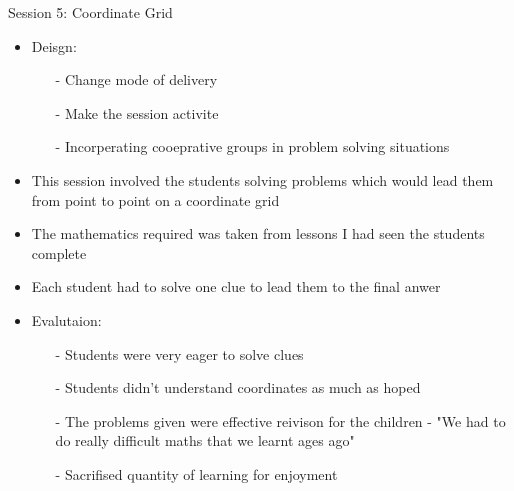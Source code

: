 \documentclass{beamer}  %
\begin{document}
\begin{frame}{Session 5: Coordinate Grid}
    \begin{itemize}
        \item Deisgn:
        \begin{itemize}
            \item[-] Change mode of delivery
            \item[-] Make the session activite
            \item[-] Incorperating cooeprative groups in problem solving situations 
        \end{itemize}
        \item This session involved the students solving problems which would lead them from point to point on a coordinate grid
        \item The mathematics required was taken from lessons I had seen the students complete
        \item Each student had to solve one clue to lead them to the final anwer
        \item Evalutaion:
        \begin{itemize}
            \item[-] Students were very eager to solve clues
            \item[-] Students didn't understand coordinates as much as hoped
            \item[-] The problems given were effective reivison for the children - "We had to do really difficult maths that we learnt ages ago"
            \item[-] Sacrifised quantity of learning for enjoyment
        \end{itemize}
    \end{itemize}
\end{frame}
\end{document}
